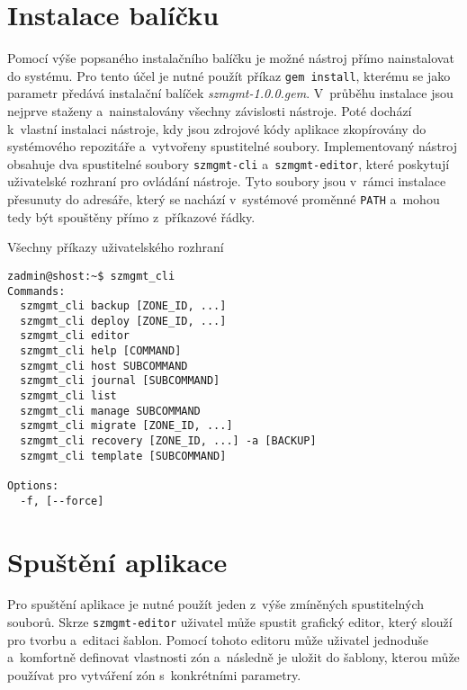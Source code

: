 \section{Instalace balíčku}
\label{appendix:installation:installation}
Pomocí výše popsaného instalačního balíčku je možné nástroj přímo nainstalovat do systému. Pro tento účel je nutné použít příkaz
\texttt{gem install}, kterému se jako parametr předává instalační balíček \textit{szmgmt-1.0.0.gem}. V~průběhu instalace jsou nejprve
staženy a~nainstalovány všechny závislosti nástroje. Poté dochází k~vlastní instalaci nástroje, kdy jsou zdrojové kódy aplikace
zkopírovány do systémového repozitáře a~vytvořeny spustitelné soubory. Implementovaný nástroj obsahuje dva spustitelné soubory
\texttt{szmgmt-cli} a~\texttt{szmgmt-editor}, které poskytují uživatelské rozhraní pro ovládání nástroje. Tyto soubory jsou
v~rámci instalace přesunuty do adresáře, který se nachází v~systémové proměnné \texttt{PATH} a~mohou tedy být spouštěny přímo 
z~příkazové řádky.
\begin{listing} 
 \caption{Všechny příkazy uživatelského rozhraní}
 \begin{verbatim}
zadmin@shost:~$ szmgmt_cli 
Commands:
  szmgmt_cli backup [ZONE_ID, ...]
  szmgmt_cli deploy [ZONE_ID, ...]
  szmgmt_cli editor
  szmgmt_cli help [COMMAND]
  szmgmt_cli host SUBCOMMAND
  szmgmt_cli journal [SUBCOMMAND]
  szmgmt_cli list
  szmgmt_cli manage SUBCOMMAND
  szmgmt_cli migrate [ZONE_ID, ...]
  szmgmt_cli recovery [ZONE_ID, ...] -a [BACKUP]
  szmgmt_cli template [SUBCOMMAND]

Options:
  -f, [--force]
 \end{verbatim}
 \label{code:cli}
\end{listing}
\section{Spuštění aplikace}
\label{appendix:installation:start}
Pro spuštění aplikace je nutné použít jeden z~výše zmíněných spustitelných souborů. Skrze \texttt{szmgmt-editor} uživatel může
spustit grafický editor, který slouží pro tvorbu a~editaci šablon. Pomocí tohoto editoru může uživatel jednoduše a~komfortně
definovat vlastnosti zón a~následně je uložit do šablony, kterou může používat pro vytváření zón s~konkrétními parametry.

